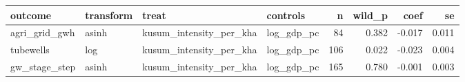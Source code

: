 \begin{tabular}{llllrrrr}
\toprule
outcome & transform & treat & controls & n & wild_p & coef & se \\
\midrule
agri_grid_gwh & asinh & kusum_intensity_per_kha & log_gdp_pc & 84 & 0.382 & -0.017 & 0.011 \\
tubewells & log & kusum_intensity_per_kha & log_gdp_pc & 106 & 0.022 & -0.023 & 0.004 \\
gw_stage_step & asinh & kusum_intensity_per_kha & log_gdp_pc & 165 & 0.780 & -0.001 & 0.003 \\
\bottomrule
\end{tabular}
